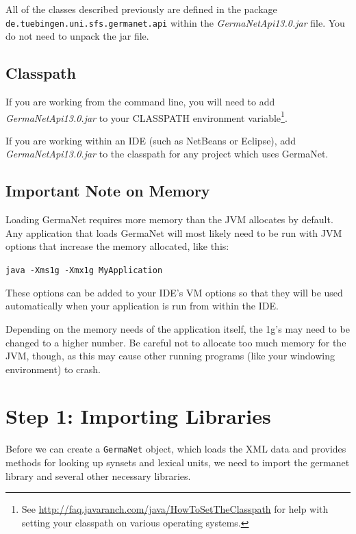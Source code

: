 \documentclass[12pt,a4paper,english,utf8]{report}
\begin{document}
All of the classes described previously are defined in the package \\ \texttt{de.tuebingen.uni.sfs.germanet.api} within the \emph{GermaNetApi13.0.jar} file. You do not need to unpack the jar file.



\subsection{Classpath}
If you are working from the command line, you will need to add \\ \emph{GermaNetApi13.0.jar} to your CLASSPATH environment variable\footnote{See \href{http://faq.javaranch.com/java/HowToSetTheClasspath}{http://faq.javaranch.com/java/HowToSetTheClasspath} for help with setting your classpath on various operating systems.}.

If you are working within an IDE (such as NetBeans or Eclipse), add \emph{GermaNetApi13.0.jar} to the classpath for any project which uses GermaNet.



\subsection{Important Note on Memory}
Loading GermaNet requires more memory than the JVM allocates by default. Any application that loads GermaNet will most likely need to be run with JVM options that increase the memory allocated, like this:

\texttt{java -Xms1g -Xmx1g MyApplication}

These options can be added to your IDE's VM options so that they will be used automatically when your application is run from within the IDE.

Depending on the memory needs of the application itself, the 1g's may need to be changed to a higher number. Be careful not to allocate too much memory for the JVM, though, as this may cause other running programs (like your windowing environment) to crash.



\section{Step 1: Importing Libraries}
Before we can create a \texttt{GermaNet} object, which loads the XML data and provides methods for looking up synsets and lexical units, we need to import the germanet library and several other necessary libraries.
\end{document}
